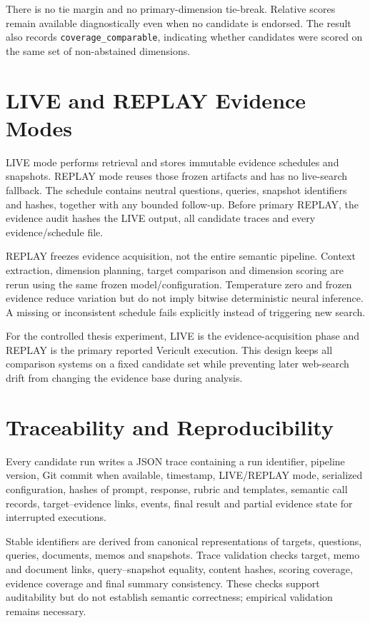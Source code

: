 There is no tie margin and no primary-dimension tie-break. Relative scores remain available diagnostically even when no candidate is endorsed. The result also records \texttt{coverage\_comparable}, indicating whether candidates were scored on the same set of non-abstained dimensions.

\section{LIVE and REPLAY Evidence Modes}

LIVE mode performs retrieval and stores immutable evidence schedules and snapshots. REPLAY mode reuses those frozen artifacts and has no live-search fallback. The schedule contains neutral questions, queries, snapshot identifiers and hashes, together with any bounded follow-up. Before primary REPLAY, the evidence audit hashes the LIVE output, all candidate traces and every evidence/schedule file.

REPLAY freezes evidence acquisition, not the entire semantic pipeline. Context extraction, dimension planning, target comparison and dimension scoring are rerun using the same frozen model/configuration. Temperature zero and frozen evidence reduce variation but do not imply bitwise deterministic neural inference. A missing or inconsistent schedule fails explicitly instead of triggering new search.

For the controlled thesis experiment, LIVE is the evidence-acquisition phase and REPLAY is the primary reported Vericult execution. This design keeps all comparison systems on a fixed candidate set while preventing later web-search drift from changing the evidence base during analysis.

\section{Traceability and Reproducibility}

Every candidate run writes a JSON trace containing a run identifier, pipeline version, Git commit when available, timestamp, LIVE/REPLAY mode, serialized configuration, hashes of prompt, response, rubric and templates, semantic call records, target--evidence links, events, final result and partial evidence state for interrupted executions.

Stable identifiers are derived from canonical representations of targets, questions, queries, documents, memos and snapshots. Trace validation checks target, memo and document links, query--snapshot equality, content hashes, scoring coverage, evidence coverage and final summary consistency. These checks support auditability but do not establish semantic correctness; empirical validation remains necessary.

